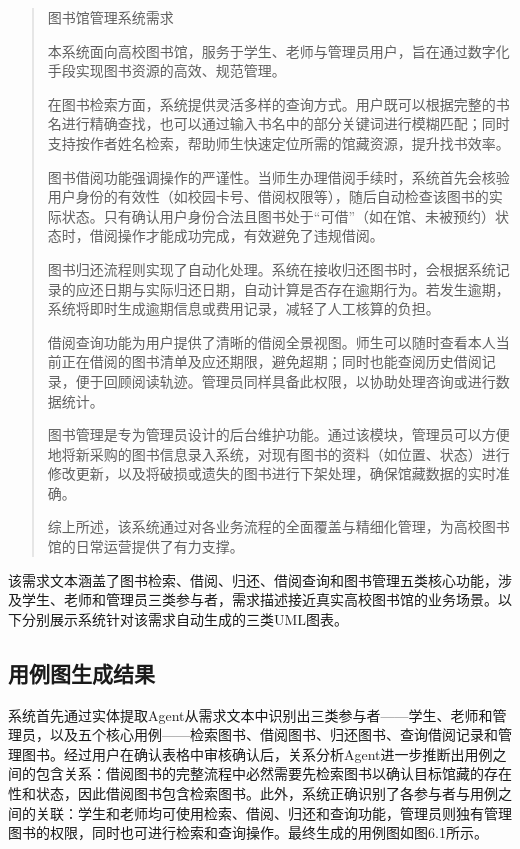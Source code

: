 \begin{quote}
图书馆管理系统需求

本系统面向高校图书馆，服务于学生、老师与管理员用户，旨在通过数字化手段实现图书资源的高效、规范管理。

在图书检索方面，系统提供灵活多样的查询方式。用户既可以根据完整的书名进行精确查找，也可以通过输入书名中的部分关键词进行模糊匹配；同时支持按作者姓名检索，帮助师生快速定位所需的馆藏资源，提升找书效率。

图书借阅功能强调操作的严谨性。当师生办理借阅手续时，系统首先会核验用户身份的有效性（如校园卡号、借阅权限等），随后自动检查该图书的实际状态。只有确认用户身份合法且图书处于“可借”（如在馆、未被预约）状态时，借阅操作才能成功完成，有效避免了违规借阅。

图书归还流程则实现了自动化处理。系统在接收归还图书时，会根据系统记录的应还日期与实际归还日期，自动计算是否存在逾期行为。若发生逾期，系统将即时生成逾期信息或费用记录，减轻了人工核算的负担。

借阅查询功能为用户提供了清晰的借阅全景视图。师生可以随时查看本人当前正在借阅的图书清单及应还期限，避免超期；同时也能查阅历史借阅记录，便于回顾阅读轨迹。管理员同样具备此权限，以协助处理咨询或进行数据统计。

图书管理是专为管理员设计的后台维护功能。通过该模块，管理员可以方便地将新采购的图书信息录入系统，对现有图书的资料（如位置、状态）进行修改更新，以及将破损或遗失的图书进行下架处理，确保馆藏数据的实时准确。

综上所述，该系统通过对各业务流程的全面覆盖与精细化管理，为高校图书馆的日常运营提供了有力支撑。
\end{quote}

该需求文本涵盖了图书检索、借阅、归还、借阅查询和图书管理五类核心功能，涉及学生、老师和管理员三类参与者，需求描述接近真实高校图书馆的业务场景。以下分别展示系统针对该需求自动生成的三类UML图表。

\subsection{用例图生成结果}

系统首先通过实体提取Agent从需求文本中识别出三类参与者——学生、老师和管理员，以及五个核心用例——检索图书、借阅图书、归还图书、查询借阅记录和管理图书。经过用户在确认表格中审核确认后，关系分析Agent进一步推断出用例之间的包含关系：借阅图书的完整流程中必然需要先检索图书以确认目标馆藏的存在性和状态，因此借阅图书包含检索图书。此外，系统正确识别了各参与者与用例之间的关联：学生和老师均可使用检索、借阅、归还和查询功能，管理员则独有管理图书的权限，同时也可进行检索和查询操作。最终生成的用例图如图6.1所示。

